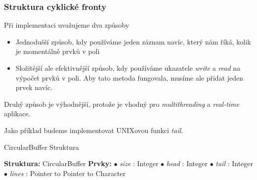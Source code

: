 \documentclass[]{fitthesispresn}
\begin{document}
    \begin{frame}
        \frametitle{Struktura cyklické fronty}
        Při implementaci uvažujeme dva způsoby
        \begin{itemize}
            \item Jednodušší způsob, kdy používáme jeden záznam navíc, který nám říká, kolik je momentálně prvků v poli
            \item Složitější ale efektivnější způsob, kdy používáme ukazatele \emph{write} a \emph{read} na výpočet prvků v poli. Aby tato metoda fungovala, musíme ale přidat jeden prvek navíc.
        \end{itemize}
        Druhý způsob je výhodnější, protože je vhodný pro \emph{multithreading} a \emph{real-time} aplikace.

        Jako příklad budeme implementovat UNIXovou funkci \emph{tail}.
        \begin{algorithm}[H]
            \caption{CircularBuffer Struktura}
            \label{alg:circularbuffer}
            \begin{algorithmic}[1]
                \State \textbf{Struktura:} CircularBuffer
                \State \textbf{Prvky:}
                \State \hspace{\algorithmicindent} $\bullet$ \textit{size} : Integer
                \State \hspace{\algorithmicindent} $\bullet$ \textit{head} : Integer
                \State \hspace{\algorithmicindent} $\bullet$ \textit{tail} : Integer
                \State \hspace{\algorithmicindent} $\bullet$ \textit{lines} : Pointer to Pointer to Character
            \end{algorithmic}
        \end{algorithm}
    \end{frame}
\end{document}
